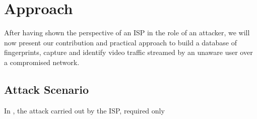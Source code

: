 \chapter{Approach}\label{sec:approach}

After having shown the perspective of an ISP in the role of an attacker, we
will now present our contribution and practical approach to build a database of
fingerprints, capture and identify video traffic streamed by an unaware user
over a compromised network. 

\section{Attack Scenario}

In , the attack carried out by the ISP, required only 

